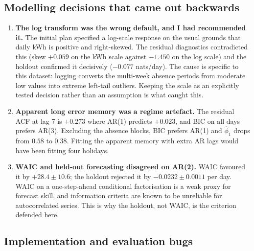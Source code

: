 \documentclass[11pt]{article}
\begin{document}
\subsection{Modelling decisions that came out backwards}

\begin{enumerate}[leftmargin=*,start=4]
\item \textbf{The log transform was the wrong default, and I had recommended
it.} The initial plan specified a log-scale response on the usual grounds that
daily kWh is positive and right-skewed. The residual diagnostics contradicted
this (skew $+0.059$ on the kWh scale against $-1.450$ on the log scale) and the
holdout confirmed it decisively ($-0.077$ nats/day). The cause is specific to
this dataset: logging converts the multi-week absence periods from moderate
low values into extreme left-tail outliers. Keeping the scale as an explicitly
tested decision rather than an assumption is what caught this.

\item \textbf{Apparent long error memory was a regime artefact.} The residual
ACF at lag 7 is $+0.273$ where AR(1) predicts $+0.023$, and BIC on all days
prefers AR(3). Excluding the absence blocks, BIC prefers AR(1) and $\hat\phi_1$
drops from $0.58$ to $0.38$. Fitting the apparent memory with extra AR lags
would have been fitting four holidays.

\item \textbf{WAIC and held-out forecasting disagreed on AR(2).} WAIC favoured
it by $+28.4 \pm 10.6$; the holdout rejected it by $-0.0232 \pm 0.0011$ per
day. WAIC on a one-step-ahead conditional factorisation is a weak proxy for
forecast skill, and information criteria are known to be unreliable for
autocorrelated series. This is why the holdout, not WAIC, is the criterion
defended here.
\end{enumerate}

\subsection{Implementation and evaluation bugs}
\end{document}
